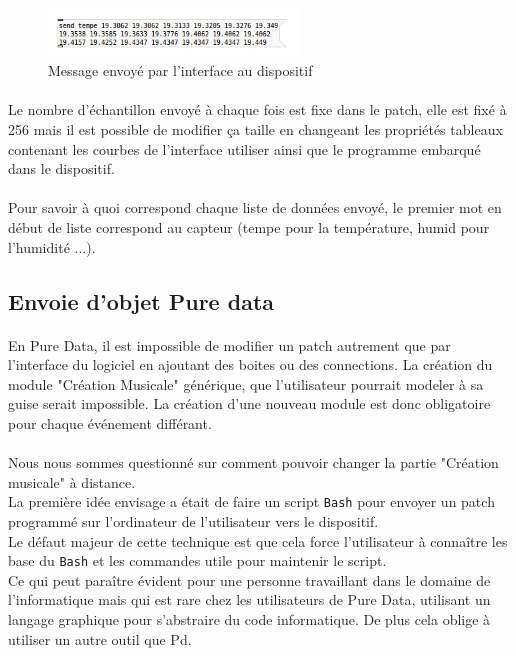 \documentclass[a4paper, titlepage, oneside, 12pt]{article}%
\begin{document}
\begin{figure}[H]
	\centering
	\includegraphics[width=250px] {senddata.jpg}
	\caption{Message envoyé par l'interface au dispositif}
\end{figure}

\paragraph{}
Le nombre d’échantillon envoyé à chaque fois est fixe dans le patch, elle est fixé à 256 mais il est possible de modifier ça taille en changeant les propriétés tableaux contenant les courbes de l'interface utiliser ainsi que le programme embarqué dans le dispositif.
\paragraph{}
Pour savoir à quoi correspond chaque liste de données envoyé, le premier mot en début de liste correspond au capteur (tempe pour la température, humid pour l'humidité ...). 


\subsection{Envoie d'objet Pure data}
\paragraph{}
En Pure Data, il est impossible de modifier un patch autrement que par l'interface du logiciel en ajoutant des boites ou des connections. La création du module "Création Musicale" générique, que l'utilisateur pourrait modeler à sa guise serait impossible. La création d'une nouveau module est donc obligatoire pour chaque événement différant.
\paragraph{}
Nous nous sommes questionné sur comment  pouvoir changer la partie "Création musicale" à distance.\\
La première idée envisage a était de faire un script \texttt{Bash} pour envoyer un patch programmé sur l'ordinateur de l'utilisateur vers le dispositif.\\
Le défaut majeur de cette technique est que cela force l'utilisateur à connaître les base du  \texttt{Bash} et les commandes utile pour maintenir le script. \\
Ce qui peut paraître évident pour une personne travaillant dans le domaine de l'informatique mais qui est rare chez les utilisateurs de Pure Data, utilisant un langage graphique pour s'abstraire du code informatique. De plus cela  oblige à utiliser un autre outil que Pd.
\end{document}
